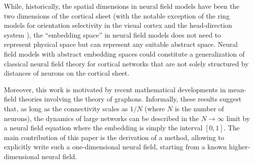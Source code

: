\documentclass[10pt,letterpaper]{article}
\begin{document}
While, historically, the spatial dimensions in neural field models have been the two dimensions of the cortical sheet (with the notable exception of the ring models for orientation selectivity in the visual cortex \cite{BenBar95} and the head-direction system \cite{Zha96}), the ``embedding space'' in neural field models does not need to represent physical space but can represent any suitable abstract space. Neural field models with abstract embedding spaces could constitute a generalization of classical neural field theory for cortical networks that are not solely structured by distances of neurons on the cortical sheet.

Moreover, this work is motivated by recent mathematical developments \cite{JabPoy21} in mean-field theories involving the theory of graphons. Informally, these results suggest that, as long as the connectivity scales as $1/N$ (where $N$ is the number of neurons), the dynamics of large networks can be described in the $N \to \infty$ limit by a neural field equation where the embedding is simply the interval $[0,1]$. The main contribution of this paper is the derivation of a method, allowing to explicitly write such a one-dimensional neural field, starting from a known higher-dimensional neural field.




\end{document}
